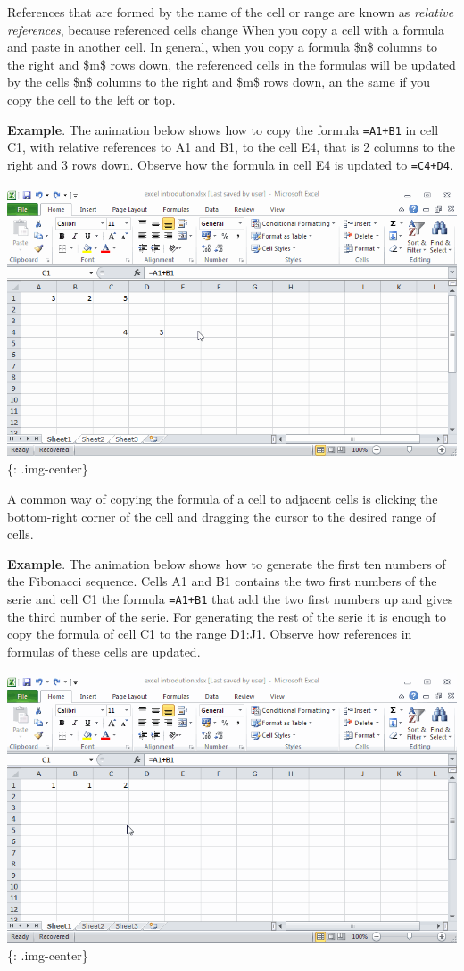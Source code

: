 References that are formed by the name of the cell or range are known as \emph{relative references}, because referenced cells change When you copy a cell with a formula and paste in another cell. In general, when you copy a formula \$n\$ columns to the right and \$m\$ rows down, the referenced cells in the formulas will be updated by the cells \$n\$ columns to the right and \$m\$ rows down, an the same if you copy the cell to the left or top. 

\textbf{Example}. The animation below shows how to copy the formula \texttt{=A1+B1} in cell C1, with relative references to A1 and B1, to the cell E4, that is 2 columns to the right and 3 rows down. Observe how the formula in cell E4 is updated to \texttt{=C4+D4}. 

\includegraphics[keepaspectratio,width=\textwidth,height=0.75\textheight]{img/example_copying_formulas_with_relative_references.gif}
\{: .img-center\}

A common way of copying the formula of a cell to adjacent cells is clicking the bottom-right corner of the cell and dragging the cursor to the desired range of cells. 

\textbf{Example}. The animation below shows how to generate the first ten numbers of the Fibonacci sequence. Cells A1 and B1 contains the two first numbers of the serie and cell C1 the formula \texttt{=A1+B1} that add the two first numbers up and gives the third number of the serie. For generating the rest of the serie it is enough to copy the formula of cell C1 to the range D1:J1. Observe how references in formulas of these cells are updated. 

\includegraphics[keepaspectratio,width=\textwidth,height=0.75\textheight]{img/example_fibonacci_serie.gif}
\{: .img-center\}

